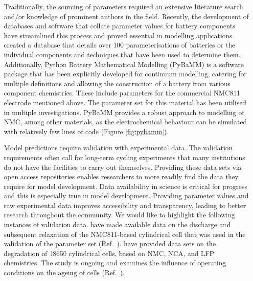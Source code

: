 \documentclass[journal=jacsat,manuscript=article]{achemso}
\begin{document}
Traditionally, the sourcing of parameters required an extensive literature search and/or knowledge of prominent authors in the field. 
Recently, the development of databases and software that collate parameter values for battery components have streamlined this process and proved essential in modelling applications.\cite{Tranter2020,Tranter_2020b} 
\citeauthor{Wang} created a database that details over 100 parameterisations of batteries or the individual components and techniques that have been used to determine them. 
Additionally, Python Battery Mathematical Modelling (PyBaMM) is a software package that has been explicitly developed for continuum modelling, catering for multiple definitions and allowing the construction of a battery from various component chemistries.\cite{Sulzer_2020} 
These include parameters for the commercial NMC811 electrode mentioned above.\cite{Chen2020} 
The parameter set for this material has been utilised in multiple investigations.\cite{Tranter2020,Tranter_2020b} 
PyBaMM provides a robust approach to modelling of NMC, among other materials, as the electrochemical behaviour can be simulated with relatively few lines of code (Figure \ref{fig:pybamm}).

Model predictions require validation with experimental data. 
The validation requirements often call for long-term cycling experiments that many institutions do not have the facilities to carry out themselves. 
Providing these data sets via open access repositories enables researchers to more readily find the data they require for model development. 
Data availability in science is critical for progress and this is especially true in model development. Providing parameter values and raw experimental data improves accessibility and transparency, leading to better research throughout the community. 
We would like to highlight the following instances of validation data. \citeauthor{Chen2020} have made available data on the discharge and subsequent relaxation of the NMC811-based cylindrical cell that was used in the validation of the parameter set (Ref.~).\cite{Chen2020}
\citeauthor{Devie_2018} have provided data sets on the degradation of 18650 cylindrical cells, based on NMC, NCA, and LFP chemistries. The study is ongoing and examines the influence of operating conditions on the ageing of cells (Ref.~).\cite{Devie_2018}
\end{document}
